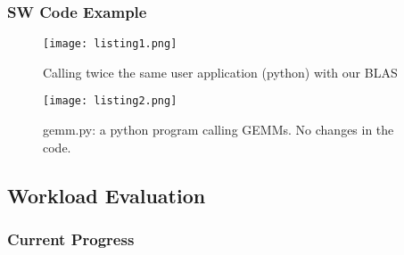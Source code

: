 \begin{frame}
	\frametitle{SW Code Example}

	\small
    \begin{figure}
        \centering
        \texttt{[image: listing1.png]}
	    \vspace{-3mm}
        \caption{Calling twice the same user application (python) with our BLAS}
    \end{figure}
	    \vspace{-2mm}

    \begin{figure}
        \centering
        \texttt{[image: listing2.png]}
	    \vspace{-3mm}
        \caption{gemm.py: a python program calling GEMMs. No changes in the code.}
    \end{figure}
	\normalsize

\end{frame}

\subsection{Workload Evaluation}
\begin{frame}
    \frametitle{Current Progress}

    \tableofcontents[currentsection,
                     subsectionstyle=show/shaded/hide,
                     sectionstyle=show/hide]

\end{frame}

